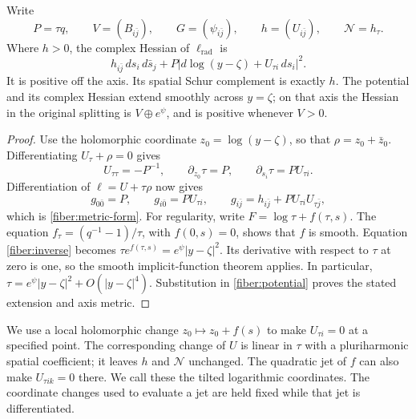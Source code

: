 \begin{lemma}
\label{fiber:metric}
Write
\[
 P=\tau q,\qquad V=(B_{i\bar j}),\qquad
 G=(\psi_{i\bar j}),\qquad h=(U_{i\bar j}),\qquad
 \mathcal N=h_\tau.
\]
Where \(h>0\), the complex Hessian of \(\ell_{\mathrm{rad}}\) is
\begin{equation}\label{fiber:metric-form}
 h_{i\bar j}\,ds_i\,d\bar s_j+
 P\left|d\log(y-\zeta)+U_{\tau i}\,ds_i\right|^2.
\end{equation}
It is positive off the axis.  Its spatial Schur complement is exactly
\(h\).  The potential and its complex Hessian extend smoothly across
\(y=\zeta\); on that axis the Hessian in the original splitting is
\(V\oplus e^\psi\), and is positive whenever \(V>0\).
\end{lemma}

\begin{proof}
Use the holomorphic coordinate \(z_0=\log(y-\zeta)\), so that
\(\rho=z_0+\bar z_0\).  Differentiating \(U_\tau+\rho=0\) gives
\[
 U_{\tau\tau}=-P^{-1},\qquad
 \partial_{z_0}\tau=P,\qquad
 \partial_{s_i}\tau=P U_{\tau i}.
\]
Differentiation of \(\ell=U+\tau\rho\) now gives
\[
 g_{0\bar0}=P,\qquad g_{i\bar0}=P U_{\tau i},\qquad
 g_{i\bar j}=h_{i\bar j}+P U_{\tau i}U_{\tau\bar j},
\]
which is \eqref{fiber:metric-form}.  For regularity, write
\(F=\log\tau+f(\tau,s)\).  The equation
\(f_\tau=(q^{-1}-1)/\tau\), with \(f(0,s)=0\), shows that \(f\)
is smooth.  Equation \eqref{fiber:inverse} becomes
\(\tau e^{f(\tau,s)}=e^\psi|y-\zeta|^2\).  Its derivative with respect
to \(\tau\) at zero is one, so the smooth implicit-function theorem
applies.  In particular,
\(\tau=e^\psi|y-\zeta|^2+O(|y-\zeta|^4)\).
Substitution in \eqref{fiber:potential} proves the stated extension and
axis metric.
\end{proof}

We use a local holomorphic change \(z_0\mapsto z_0+f(s)\) to make
\(U_{\tau i}=0\) at a specified point.  The corresponding change of
\(U\) is linear in \(\tau\) with a pluriharmonic spatial coefficient;
it leaves \(h\) and \(\mathcal N\) unchanged.  The quadratic jet of
\(f\) can also make \(U_{\tau ik}=0\) there.  We call these the tilted
logarithmic coordinates.  The coordinate changes used to evaluate a jet
are held fixed while that jet is differentiated.

